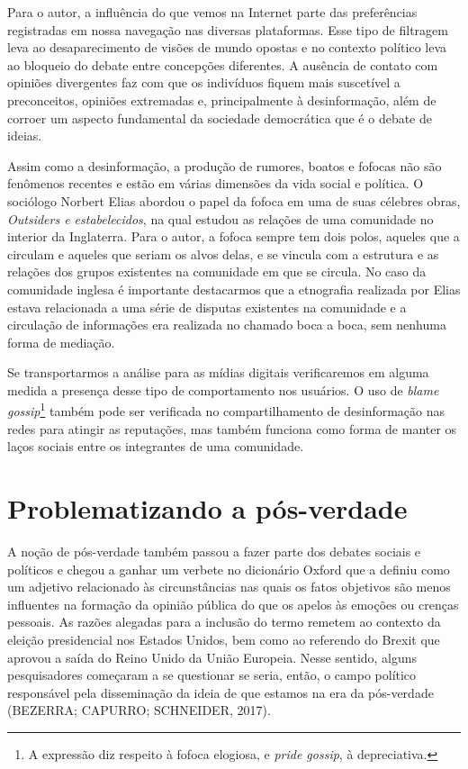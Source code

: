 Para o autor, a influência do que vemos na Internet parte das
preferências registradas em nossa navegação nas diversas plataformas.
Esse tipo de filtragem leva ao desaparecimento de visões de mundo
opostas e no contexto político leva ao bloqueio do debate entre
concepções diferentes. A ausência de contato com opiniões divergentes
faz com que os indivíduos fiquem mais suscetível a preconceitos,
opiniões extremadas e, principalmente à desinformação, além de corroer
um aspecto fundamental da sociedade democrática que é o debate de
ideias.

Assim como a desinformação, a produção de rumores, boatos e fofocas não
são fenômenos recentes e estão em várias dimensões da vida social e
política. O sociólogo Norbert Elias abordou o papel da fofoca em uma de
suas célebres obras, \textit{Outsiders e estabelecidos}, na qual estudou
as relações de uma comunidade no interior da Inglaterra. Para o autor, a
fofoca sempre tem dois polos, aqueles que a circulam e aqueles que
seriam os alvos delas, e se vincula com a estrutura e as relações dos
grupos existentes na comunidade em que se circula. No caso da comunidade
inglesa é importante destacarmos que a etnografia realizada por Elias
estava relacionada a uma série de disputas existentes na comunidade e a
circulação de informações era realizada no chamado boca a boca, sem
nenhuma forma de mediação.

Se transportarmos a análise para as mídias digitais verificaremos em
alguma medida a presença desse tipo de comportamento nos usuários. O uso
de \textit{blame gossip}\footnote{A expressão diz respeito à fofoca elogiosa, e \textit{pride gossip}, à depreciativa.} também pode ser verificada no compartilhamento de
desinformação nas redes para atingir as reputações, mas também funciona
como forma de manter os laços sociais entre os integrantes de uma
comunidade.

\section{Problematizando a pós-verdade}

A noção de pós-verdade também passou a fazer parte dos debates sociais e
políticos e chegou a ganhar um verbete no dicionário Oxford que a
definiu como um adjetivo relacionado às circunstâncias nas quais os
fatos objetivos são menos influentes na formação da opinião pública do
que os apelos às emoções ou crenças pessoais. As razões alegadas para a
inclusão do termo remetem ao contexto da eleição presidencial nos
Estados Unidos, bem como ao referendo do Brexit que aprovou a
saída do Reino Unido da União Europeia. Nesse sentido, alguns
pesquisadores começaram a se questionar se seria, então, o campo
político responsável pela disseminação da ideia de que estamos na era da
pós-verdade (BEZERRA; CAPURRO; SCHNEIDER, 2017).

